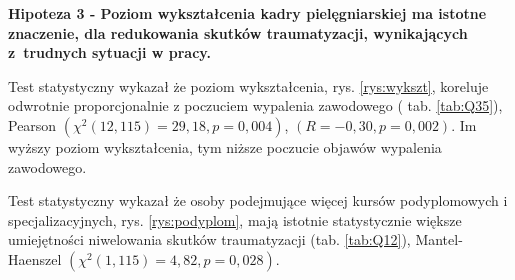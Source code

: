 \documentclass[a4paper,12pt,twoside,openright]{mwrep}
\begin{document}


	

	
	
	





%

%



\vspace{\baselineskip} 
\textbf{Hipoteza 3 - Poziom wykształcenia kadry pielęgniarskiej ma istotne znaczenie, dla redukowania skutków traumatyzacji, wynikających z~trudnych sytuacji w pracy.}
\vspace{\baselineskip} 


	Test statystyczny wykazał że poziom wykształcenia, rys. \ref{rys:wykszt}, koreluje odwrotnie proporcjonalnie z poczuciem wypalenia zawodowego ( tab. \ref{tab:Q35}), Pearson $(\chi^2 (12, 115) = 29,18, p=0,004)$, $(R = -0,30, p = 0,002)$. Im wyższy poziom wykształcenia, tym niższe poczucie objawów wypalenia zawodowego.
		
	Test statystyczny wykazał że osoby podejmujące więcej kursów podyplomowych i specjalizacyjnych, rys. \ref{rys:podyplom}, mają istotnie statystycznie większe umiejętności niwelowania skutków traumatyzacji  (tab. \ref{tab:Q12}), Mantel-Haenszel $(\chi^2 (1, 115) = 4,82, p=0,028)$. 
\end{document}
